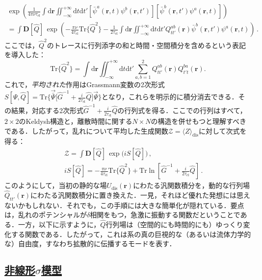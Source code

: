 \documentclass[a4paper,11pt]{ltjsarticle}
\newcommand{\subsectionlink}[1]{\subsection[#1]{\hyperlink{toc}{#1}}}
\def\Tr{\mathrm{Tr}}
\def\d{\mathrm{d}}
\def\D{\mathbf{D}}
\def\rt{(\mathbf{r},t)}
\def\rtp{(\mathbf{r},t')}
\def\tauel{\tau_{\mathrm{el}}}
\begin{document}
\begin{eqnarray}\label{NLSM-HS-transform}
\exp\left(\frac{1}{4\pi\nu\tauel}\int\d\mathbf{r}
\iint^{+\infty}_{-\infty}\d t\d t'
[\bar{\psi}^{a}\rt\psi^{b}\rtp][\bar{\psi}^{b}\rtp\psi^{a}\rt]\right)\nonumber
\\
=\int\D[\hat{Q}]\,\exp\left(-\frac{\pi\nu}{4\tauel}\Tr\{
\hat{Q}^{2}\}-\frac{1}{2\tauel}\int\d\mathbf{r}\iint^{+\infty}_{-\infty}\d
t \d t'
Q^{ab}_{tt'}(\mathbf{r})\bar{\psi}^{b}\rtp\psi^{a}\rt\right)\,.
\end{eqnarray}
ここでは，$\hat{Q}^{2}$のトレースに行列添字の和と時間・空間積分を含めるという表記を導入した：
\begin{equation}
\Tr\big\{\hat{Q}^{2}\big\}=\int\d\mathbf{r}\iint^{+\infty}_{-\infty} \d t\d
t'\sum^{2}_{a,b=1}Q^{ab}_{tt'}(\mathbf{r})Q^{ba}_{t't}(\mathbf{r}).
\end{equation}
これで，{\em 平均された}作用はGrassmann変数の2次形式$S[\Psi,\hat{Q}]=\Tr\big\{\vec{\bar{\Psi}}\big[\hat{G}^{-1}+
\frac{i}{2\tau_{\mathrm{el}}}\hat{Q}]\vec{\Psi}\big\}$となり，これらを明示的に積分消去できる．その結果，対応する2次形式$\hat{G}^{-1}+\frac{i}{2\tau_{\mathrm{el}}}\hat{Q}$の行列式を得る．ここでの行列はすべて，$2\times 2$のKeldysh構造と，離散時間に関する$N\times N$の構造を併せもつと理解すべきである．したがって，乱れについて平均した生成関数$\mathcal{Z}=\langle Z\rangle_{\mathrm{dis}}$に対して次式を得る：
\begin{eqnarray}\label{NLSM-action}
&&\mathcal{Z}=\int\D[\hat Q]\,\exp\big(iS[\hat Q]\big)\,,\nonumber\\
&&iS[\hat Q]=-\frac{\pi\nu}{4\tauel}\Tr\big\{\hat{Q}^{2}\big\}+
\Tr\ln\left[\hat{G}^{-1}+\frac{i}{2\tauel}\hat{Q}\right]\,.
\end{eqnarray}
このようにして，当初の静的な場$U_{\mathrm{dis}}(\mathbf{r})$にわたる汎関数積分を，動的な行列場$\hat{Q}_{tt'}(\mathbf{r})$にわたる汎関数積分に置き換えた．一見，それほど優れた発想には思えないかもしれない．それでも，この手順には大きな簡単化が隠れている．要点は，乱れのポテンシャルが$\delta$相関をもつ，急激に振動する関数だということである．一方，以下に示すように，$\hat Q$行列場は（空間的にも時間的にも）ゆっくり変化する関数である．したがって，これは系の真の巨視的な（あるいは流体力学的な）自由度，すなわち拡散的に伝播するモードを表す．



\subsectionlink{非線形$\sigma$模型}\label{sec_NLSM-2}
\end{document}
